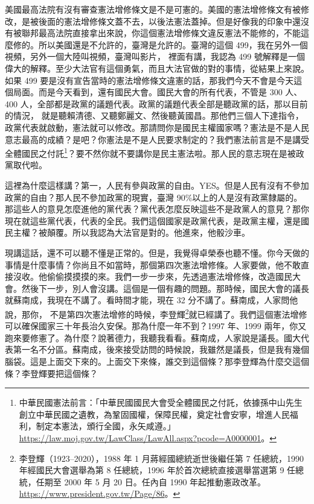 \hypertarget{w05:cue:327}{}美國最高法院有沒有審查憲法增修條文是不是可憲的。美國的憲法增修條文有被修改，是被後面的憲法增修條文蓋不去，以後法憲法蓋掉。但是好像我的印象中還沒有被聯邦最高法院直接拿出來說，你這個憲法增修條文違反憲法不能修的，不能這麼修的。所以美國還是不允許的，臺灣是允許的。臺灣的這個 499，我在另外一個視頻，另外一個大陸叫視頻，臺灣叫影片，
\hypertarget{w05:cue:328}{}裡面有講，我認為 499 號解釋是一個偉大的解釋。至少大法官有這個勇氣，而且大法官做的對的事情，從結果上來說。如果 499 要是沒有宣告當時的憲法增修條文違憲的話，那我們今天不會是今天這個局面。而是今天看到，還有國民大會。國民大會的所有代表，不管是 300 人、400 人，全部都是政黨的議題代表。政黨的議題代表全部是聽政黨的話，那以目前的情況，
\hypertarget{w05:cue:329}{}就是聽賴清德、又聽鄭麗文、然後聽黃國昌。那他們三個人下達指令，政黨代表就啟動，憲法就可以修改。那請問你是國民主權國家嗎？憲法是不是人民意志最高的成績？是吧？你憲法是不是人民要求制定的？我們憲法前言是不是講受全體國民之付託\footnote{中華民國憲法前言：「中華民國國民大會受全體國民之付託，依據孫中山先生創立中華民國之遺教，為鞏固國權，保障民權，奠定社會安寧，增進人民福利，制定本憲法，頒行全國，永矢咸遵。」\url{https://law.moj.gov.tw/LawClass/LawAll.aspx?pcode=A0000001}。}？要不然你就不要講你是民主憲法啦。那人民的意志現在是被政黨取代啦。

\hypertarget{w05:cue:330}{}這裡為什麼這樣講？第一，人民有參與政黨的自由。YES。但是人民有沒有不參加政黨的自由？那人民不參加政黨的現實，臺灣 90\%以上的人是沒有政黨隸屬的。那這些人的意見怎麼進他的黨代表？黨代表怎麼反映這些不是政黨人的意見？那你現在就這些黨代表，代表的全民。我們這個國家是政黨代表，是政黨主權，還是國民主權？被顛覆。所以我認為大法官是對的。他進來，他骰沙車。

\hypertarget{w05:cue:331}{}現講這話，還不可以聽不懂是正常的。但是，我覺得卓榮泰也聽不懂。你今天做的事情是什麼事情？你尚且不如當時，那個第四次憲法增修條。人家要做，他不敢直接沒收。他偷偷摸摸摸的來。我們一步一步來，先透過憲法增修條，改造國民大會。然後下一步，別人會沒講。這個是一個有趣的問題。那時候，國民大會的議長就蘇南成，我現在不講了。看時間才能，現在 32 分不講了。蘇南成，人家問他說，那你，
\hypertarget{w05:cue:332}{}不是第四次憲法增修的時候，李登輝\footnote{李登輝（1923–2020），1988 年 1 月蔣經國總統逝世後繼任第 7 任總統，1990 年經國民大會選舉為第 8 任總統，1996 年於首次總統直接選舉當選第 9 任總統，任期至 2000 年 5 月 20 日。任內自 1990 年起推動憲政改革。\url{https://www.president.gov.tw/Page/86}。}就已經講了。我們這個憲法增修可以確保國家三十年長治久安保。那為什麼一年不到？1997 年、1999 兩年，你又跑來要修憲了。為什麼？說著德力，我聽我看看。蘇南成，人家說是議長。國大代表第一名不分區。蘇南成，後來接受訪問的時候說，我雖然是議長，但是我有幾個腦袋。這是上面交下來的。上面交下來條，誰交到這個條？那李登輝為什麼交這個條？李登輝要把這個條？

